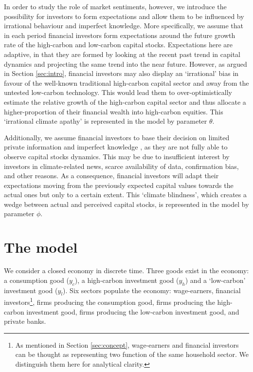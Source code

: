 \documentclass[authoryear]{article}
\begin{document}
In order to study the role of market sentiments, however, we introduce the possibility for investors to form expectations and allow them to be influenced by irrational behaviour and imperfect knowledge. More specifically, we assume that in each period financial investors form expectations around the future growth rate of the high-carbon and low-carbon capital stocks. Expectations here are adaptive, in that they are formed by looking at the recent past trend in capital dynamics and projecting the same trend into the near future. However, as argued in Section \ref{sec:intro}, financial investors may also display an `irrational' bias in favour of the well-known traditional high-carbon capital sector and away from the untested low-carbon technology. This would lead them to over-optimistically estimate the relative growth of the high-carbon capital sector and thus allocate a higher-proportion of their financial wealth into high-carbon equities. This `irrational climate apathy' is represented in the model by parameter $\theta$. 

Additionally, we assume financial investors to base their decision on limited private information and imperfect knowledge \citep{Daniel1998}, as they are not fully able to observe capital stocks dynamics. This may be due to insufficient interest by investors in climate-related news, scarce availability of data, confirmation bias, and other reasons. As a consequence, financial investors will adapt their expectations moving from the previously expected capital values towards the actual ones but only to a certain extent. This `climate blindness', which creates a wedge between actual and perceived capital stocks, is represented in the model by parameter $\phi$.


\section{The model}
\label{sec:model}

We consider a closed economy in discrete time. Three goods exist in the economy: a consumption good ($y_c$), a high-carbon investment good ($y_h$) and a `low-carbon' investment good ($y_l$). Six sectors populate the economy: wage-earners, financial investors\footnote{As mentioned in Section \ref{sec:concept}, wage-earners and financial investors can be thought as representing two function of the same household sector. We distinguish them here for analytical clarity.}, firms producing the consumption good, firms producing the high-carbon investment good, firms producing the low-carbon investment good, and private banks. 
\end{document}
